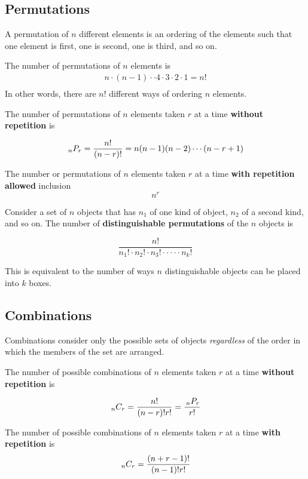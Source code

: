 \subsection{Permutations}
A permutation of \(n\) different elements is an ordering of the elements such that one element is first, one is second, one is third, and so on.

The number of permutations of \(n\) elements is
\[
	\begin{array}{l}{n \cdot(n-1) \cdot \cdot 4 \cdot 3 \cdot 2 \cdot 1=n !} \\ \end{array}
\]
In other words, there are \( n! \) different ways of ordering \(n\) elements.

The number of permutations of \(n\) elements taken \(r\) at a time \textbf{without repetition}  is

\[
	\,_{n}P_{r}=\frac{n !}{(n-r) !}=n(n-1)(n-2) \cdots(n-r+1)
\]

The number or permutations of \( n \) elements taken \( r \) at a time \textbf{with repetition allowed}  inclusion
\[
n^r	
\]

Consider a set of \(n\) objects that has \(n_1\) of one kind of object, \(n_2\) of a second kind, and so on. The number of \textbf{distinguishable permutations} of the \(n\) objects is

\begin{equation}
	\frac{n !}{n_{1} ! \cdot n_{2} ! \cdot n_{3} ! \cdot \cdot \cdot \cdot \cdot n_{k} !}
\end{equation}

This is equivalent to the number of ways \( n \) distinguishable objects can be placed into \( k \) boxes.

\subsection{Combinations}

Combinations consider only the possible sets of objects \emph{regardless} of the order in which the members of the set are arranged.

The number of possible combinations of \(n\) elements taken \(r\) at a time \textbf{without repetition}  is

\begin{equation}
	\,_{n}C_{r}=\frac{n !}{(n-r) ! r !} = \frac{\,_{n}P_{r}}{r!}
\end{equation}


The number of possible combinations of \(n\) elements taken \(r\) at a time \textbf{with repetition}  is
\[
	\,_{n}C_{r}=\frac{(n+r-1)!}{(n-1)!r!}	
\]

